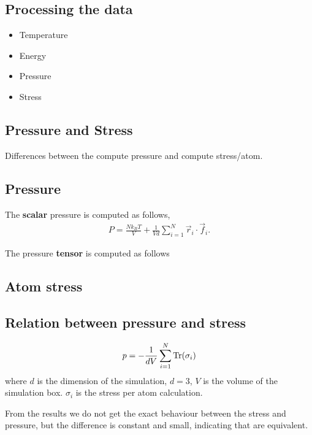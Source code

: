 \documentclass[main.tex]{subfiles}
\begin{document}
\subsection{Processing the data}

\begin{itemize}
    \item Temperature
    \item Energy
    \item Pressure
    \item Stress
\end{itemize}

\subsection{Pressure and Stress}

Differences between the compute pressure and compute stress/atom.

\subsection{Pressure}

The \textbf{scalar} pressure is computed as follows,
\begin{gather*}
    P=\frac{Nk_{B}T}{V}+\frac{1}{Vd}\sum_{i=1}^N\vec{r}_i\cdot\vec{f}_i.
\end{gather*}

The pressure \textbf{tensor} is computed as follows



\subsection{Atom stress}

\subsection{Relation between pressure and stress}

\begin{gather*}
    p=-\frac{1}{dV}\sum_{i=1}^{N}\mathrm{Tr}\qty(\sigma_i)
\end{gather*}
where $d$ is the dimension of the simulation, $d=3$, $V$ is the volume of the simulation box.
$\sigma_i$ is the stress per atom calculation.

From the results we do not get the exact behaviour between the stress and pressure, but the difference is constant and small, indicating that are equivalent.
\end{document}
